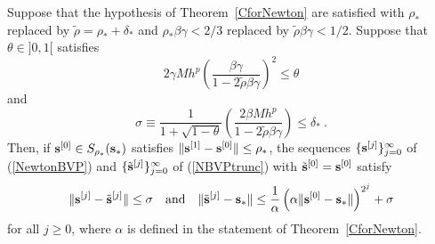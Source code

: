 \begin{theorem}
Suppose that the hypothesis of Theorem~\ref{CforNewton} are
satisfied with $\rho_\ast$ replaced by
$\tilde{\rho} = \rho_\ast + \delta_\ast$ and
$\rho_\ast\beta\gamma < 2/3$ replaced by $\tilde{\rho}\beta\gamma < 1/2$.
Suppose that $\theta \in ]0,1[$ satisfies
\begin{equation} \label{errorA}
2\gamma M h^p \left( \frac{\beta\gamma}{1-2\tilde{\rho}\beta\gamma}\right)^2
\leq \theta 
\end{equation}
and
\begin{equation} \label{errorB}
\sigma \equiv \frac{1}{1+\sqrt{1-\theta}}\left(
\frac{2\beta M h^p}{1-2\tilde{\rho}\beta\gamma} \right)
\leq \delta_\ast \ . 
\end{equation}
Then, if $\mathbf{s}^{[0]} \in S_{\rho_\ast}(\mathbf{s}_\ast)$ satisfies
$\| \mathbf{s}^{[1]} - \mathbf{s}^{[0]} \| \leq \rho_\ast$, the
sequences $\{ \mathbf{s}^{[j]} \}_{j=0}^\infty$ of (\ref{NewtonBVP}) and
$\{ \tilde{\mathbf{s}}^{[j]} \}_{j=0}^\infty$ of (\ref{NBVPtrunc}) with
$\tilde{\mathbf{s}}^{[0]} = \mathbf{s}^{[0]}$ satisfy
\[
\| \mathbf{s}^{[j]} - \tilde{\mathbf{s}}^{[j]} \|  \leq \sigma
\quad \text{and} \quad
\| \tilde{\mathbf{s}}^{[j]} - \mathbf{s}_\ast \| \leq
\frac{1}{\alpha} \left( \alpha
\| \mathbf{s}^{[0]} - \mathbf{s}_\ast \|  \right)^{2^j} + \sigma
\]
for all $j\geq 0$, where $\alpha$ is defined in the statement of
Theorem~\ref{CforNewton}.
\end{theorem}

